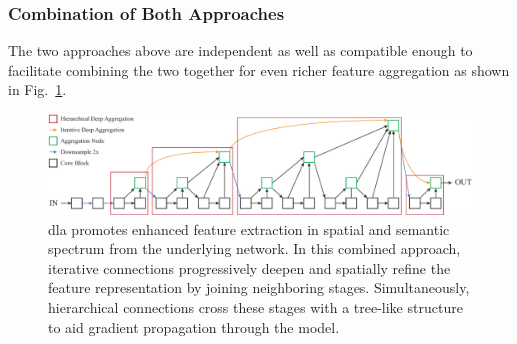 \subsubsection{Combination of Both Approaches}

The two approaches above are independent as well as compatible enough to facilitate combining the two together for even richer feature aggregation as shown in Fig.~\ref{fig:DLACombination}.

\begin{figure}[t]
    \centerline{\includegraphics[width=0.9\linewidth]{figures/theoretical_foundations/dla_ida_hda_combination.pdf}}
    \caption[Combination of \gls{ida} and \gls{hda}]{\Gls{dla} promotes enhanced feature extraction in spatial and semantic spectrum from the underlying network. In this combined approach, iterative connections progressively deepen and spatially refine the feature representation by joining neighboring stages. Simultaneously, hierarchical connections cross these stages with a tree-like structure to aid gradient propagation through the model. }
    \label{fig:DLACombination}
\end{figure}
